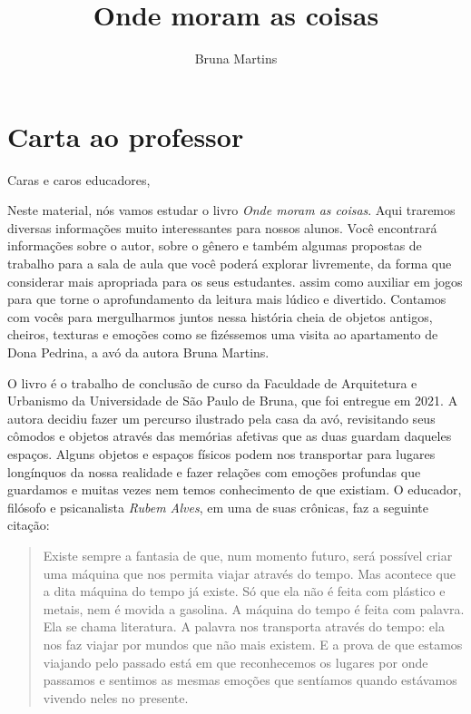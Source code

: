 \documentclass[11pt]{extarticle}
\newcommand{\AutorLivro}{Bruna Martins}
\newcommand{\TituloLivro}{Onde moram as coisas}
\newcommand{\colaborador}{Gabriela Karam}
\begin{document}
\title{\TituloLivro}
\author{\AutorLivro}
\def\authornotes{\colaborador}

\date{}
\maketitle


\tableofcontents

\section{Carta ao professor}

Caras e caros educadores,

Neste material, nós vamos estudar o livro \textit{Onde moram as coisas}. Aqui traremos diversas informações muito interessantes para nossos alunos. Você encontrará informações sobre o autor, sobre o gênero e também algumas propostas de trabalho para a sala de aula que você poderá explorar livremente, da forma que considerar mais apropriada para os seus estudantes. assim como auxiliar em jogos para que torne o aprofundamento da leitura mais lúdico e divertido. Contamos com vocês para mergulharmos juntos nessa história cheia de objetos antigos, cheiros, texturas e emoções como se fizéssemos uma visita ao apartamento de Dona Pedrina, a avó da autora Bruna Martins. 

O livro é o trabalho de conclusão de curso da Faculdade de Arquitetura e Urbanismo da Universidade de São Paulo de Bruna, que foi entregue em 2021. A autora decidiu fazer um percurso ilustrado pela casa da avó, revisitando seus cômodos e objetos através das memórias afetivas que as duas guardam daqueles espaços. Alguns objetos e espaços físicos podem nos transportar para lugares longínquos da nossa realidade e fazer relações com emoções profundas que guardamos e muitas vezes nem temos conhecimento de que existiam. O educador, filósofo e psicanalista \textit{Rubem Alves}, em uma de suas crônicas, faz a seguinte citação:

\begin{quote}

Existe sempre a fantasia de que, num momento futuro, será possível criar uma máquina que nos permita viajar através do tempo. Mas acontece que a dita máquina do tempo já existe. Só que ela não é feita com plástico e metais, nem é movida a gasolina. A máquina do tempo é feita com palavra. Ela se chama literatura. A palavra nos transporta através do tempo: ela nos faz viajar por mundos que não mais existem. E a prova de que estamos viajando pelo passado está em que reconhecemos os lugares por onde passamos e sentimos as mesmas emoções que sentíamos quando estávamos vivendo neles no presente.

\end{quote}
\end{document}
